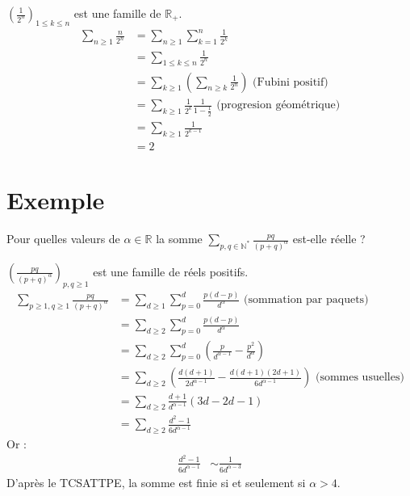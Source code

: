 \documentclass[../main.tex]{subfiles}
\begin{document}
\noindent $\left( \frac{1}{2^n} \right)_{1\leq k\leq n}$ est une famille de $\mathbb{R}_+$.
\begin{align*}
    \sum_{n\geq 1} \frac{n}{2^n} &= \sum_{n\geq 1} \sum_{k=1}^{n} \frac{1}{2^k} \\
    &= \sum_{1\leq k\leq n} \frac{1}{2^n} \\
    &= \sum_{k\geq 1} \left( \sum_{n\geq k} \frac{1}{2^n} \right) \text{ (Fubini positif)} \\
    &= \sum_{k\geq 1} \frac{1}{2^k} \frac{1}{1 - \frac{1}{2}} \text{ (progresion géométrique)} \\
    &= \sum_{k\geq 1} \frac{1}{2^{k-1}} \\
    &= 2
\end{align*}

\section{Exemple}
\begin{tcolorbox}[title=Exemple 35.19, title filled=false, colframe=darkgreen, colback=darkgreen!10!white]
    Pour quelles valeurs de $\alpha\in \mathbb{R}$ la somme $\sum\limits_{p, q\in \mathbb{N}^*} \frac{pq}{(p+q)^\alpha}$ est-elle réelle ?
\end{tcolorbox}

\noindent $\left( \frac{pq}{(p+q)^\alpha} \right)_{p, q\geq 1}$ est une famille de réels positifs. 
\begin{align*}
    \sum_{p\geq 1, q\geq 1} \frac{pq}{(p+q)^\alpha} &= \sum_{d\geq 1} \sum_{p=0}^{d} \frac{p(d-p)}{d^\alpha} \text{ (sommation par paquets)} \\
    &= \sum_{d\geq 2} \sum_{p=0}^{d} \frac{p(d-p)}{d^\alpha} \\
    &= \sum_{d\geq 2} \sum_{p=0}^{d} \left( \frac{p}{d^{\alpha - 1}} - \frac{p^2}{d^\alpha} \right) \\
    &= \sum_{d\geq 2} \left( \frac{d(d+1)}{2d^{\alpha - 1}} - \frac{d(d+1)(2d+1)}{6d^{\alpha - 1}} \right) \text{ (sommes usuelles)} \\
    &= \sum_{d\geq 2} \frac{d+1}{d^{\alpha - 1}} (3d - 2d - 1) \\
    &= \sum_{d\geq 2} \frac{d^2 - 1}{6d^{\alpha - 1}}
\end{align*}
Or : 
\begin{align*}
    \frac{d^2 - 1}{6d^{\alpha - 1}} &\sim \frac{1}{6d^{\alpha - 3}} 
\end{align*}
D'après le TCSATTPE, la somme est finie si et seulement si $\alpha > 4$.
\end{document}
